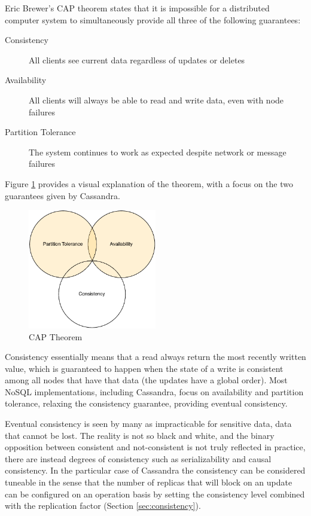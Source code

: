 Eric Brewer's CAP theorem \cite{Brewer2000} states that it is impossible for a distributed computer system to simultaneously provide all three of the following guarantees:
\begin{description}
	\item[Consistency] All clients see current data regardless of updates or deletes
	\item[Availability] All clients will always be able to read and write data, even with node failures
	\item[Partition Tolerance] The system continues to work as expected despite network or message failures
\end{description}

Figure \ref{fig:cap} provides a visual explanation of the theorem, with a focus on the two guarantees given by Cassandra.

\begin{figure}[htb]
  \begin{center}
    \leavevmode
    \includegraphics[width=0.5\textwidth]{images/cap}
  \end{center}
  \caption{CAP Theorem}
  \label{fig:cap}
\end{figure}

Consistency essentially means that a read always return the most recently written value, which is guaranteed to happen when the state of a write is consistent among all nodes that have that data (the updates have a global order). Most NoSQL implementations, including Cassandra, focus on availability and partition tolerance, relaxing the consistency guarantee, providing eventual consistency.  

Eventual consistency is seen by many as impracticable for sensitive data, data that cannot be lost. The reality is not so black and white, and the binary opposition between consistent and not-consistent is not truly reflected in practice, there are instead degrees of consistency such as serializability and causal consistency. In the particular case of Cassandra the consistency can be considered tuneable in the sense that the number of replicas that will block on an update can be configured on an operation basis by setting the consistency level combined with the replication factor (Section \ref{sec:consistency}).



